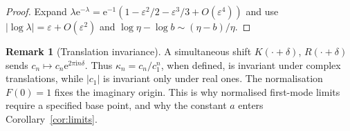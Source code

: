 \documentclass[11pt]{amsart}
\theoremstyle{definition}
\newtheorem{remark}[theorem]{Remark}
\newcommand{\Rr}{R}
\newcommand{\Kk}{K}
\newcommand{\eee}{\mathrm{e}}
\newcommand{\ii}{\mathrm{i}}
\begin{document}
\begin{proof}
Expand $\lambda\eee^{-\lambda}=\eee^{-1}(1-\varepsilon^2/2-\varepsilon^3/3+O(\varepsilon^4))$ and use
$|\log\lambda|=\varepsilon+O(\varepsilon^2)$ and $\log\eta-\log b\sim(\eta-b)/\eta$.
\end{proof}

\begin{remark}[Translation invariance]\label{rem:invariance}
A simultaneous shift $\Kk(\cdot+\delta)$, $\Rr(\cdot+\delta)$ sends
$c_n\mapsto c_n\eee^{2\pi\ii n\delta}$.  Thus $\kappa_n=c_n/c_1^n$, when
defined, is invariant under complex translations, while $|c_1|$ is invariant
only under real ones.
The normalisation $F(0)=1$ fixes the imaginary origin.  This is why
normalised first-mode limits require a specified base point, and why the
constant $a$ enters Corollary~\ref{cor:limits}.
\end{remark}
\end{document}
